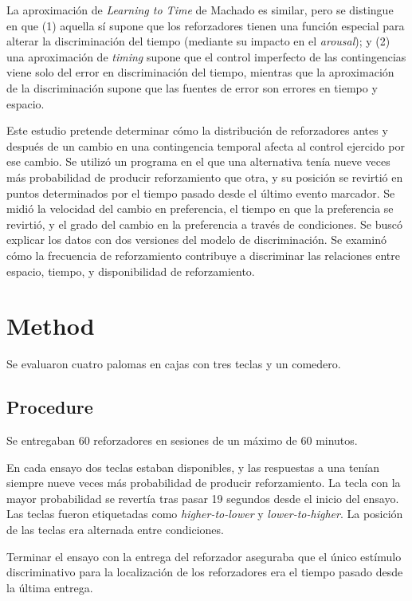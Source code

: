 \documentclass[a4paper,12pt]{article}
\begin{document}
La aproximación de {\itshape Learning to Time} de Machado es similar, pero se distingue en que (1) aquella sí supone que los reforzadores tienen una función especial para alterar la discriminación del tiempo (mediante su impacto en el {\itshape arousal}); y (2) una aproximación de {\itshape timing} supone que el control imperfecto de las contingencias viene solo del error en discriminación del tiempo, mientras que la aproximación de la discriminación supone que las fuentes de error son errores en tiempo y espacio.

Este estudio pretende determinar cómo la distribución de reforzadores antes y después de un cambio en una contingencia temporal afecta al control ejercido por ese cambio.
Se utilizó un programa en el que una alternativa tenía nueve veces más probabilidad de producir reforzamiento que otra, y su posición se revirtió en puntos determinados por el tiempo pasado desde el último evento marcador.
Se midió la velocidad del cambio en preferencia, el tiempo en que la preferencia se revirtió, y el grado del cambio en la preferencia a través de condiciones.
Se buscó explicar los datos con dos versiones del modelo de discriminación.
Se examinó cómo la frecuencia de reforzamiento contribuye a discriminar las relaciones entre espacio, tiempo, y disponibilidad de reforzamiento.

\section{Method}

Se evaluaron cuatro palomas en cajas con tres teclas y un comedero.

\subsection{Procedure}

Se entregaban 60 reforzadores en sesiones de un máximo de 60 minutos.

En cada ensayo dos teclas estaban disponibles, y las respuestas a una tenían siempre nueve veces más probabilidad de producir reforzamiento.
La tecla con la mayor probabilidad se revertía tras pasar 19 segundos desde el inicio del ensayo.
Las teclas fueron etiquetadas como {\itshape higher-to-lower} y {\itshape lower-to-higher}.
La posición de las teclas era alternada entre condiciones.

Terminar el ensayo con la entrega del reforzador aseguraba que el único estímulo discriminativo para la localización de los reforzadores era el tiempo pasado desde la última entrega.
\end{document}
